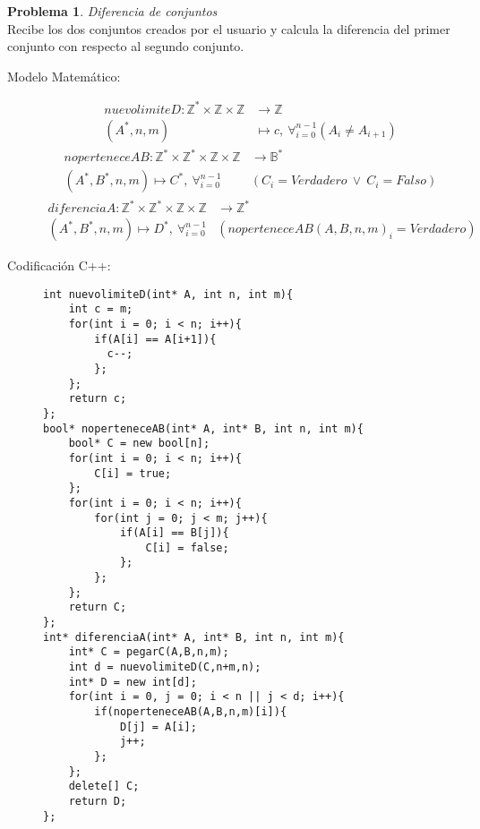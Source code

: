 \documentclass{article}
\theoremstyle{plain}
\theoremstyle{definition}
\newtheorem{problem}{Problema}
\begin{document}
\begin{problem}\emph{Diferencia de conjuntos}\\
Recibe los dos conjuntos creados por el usuario y calcula la diferencia del primer conjunto con respecto al segundo conjunto.
\begin{description}
\item[Modelo Matemático:]
%
\begin{align*}
nuevolimiteD: \mathbb{Z}^*\times\mathbb{Z}\times\mathbb{Z}&\to \mathbb{Z}\\
(A^*,n,m) &\mapsto c,\ \forall_{i=0}^{n-1}(A_i \neq A_{i+1})
\end{align*}
%
\begin{align*}
noperteneceAB: \mathbb{Z}^*\times\mathbb{Z}^*\times\mathbb{Z}\times\mathbb{Z}&\to \mathbb{B}^*\\
(A^*,B^*,n,m)\mapsto C^*,\ \forall_{i=0}^{n-1}&(C_i = Verdadero\ \lor \ C_i = Falso)
\end{align*}
%
\begin{align*}
diferenciaA: \mathbb{Z}^*\times\mathbb{Z}^*\times\mathbb{Z}\times\mathbb{Z}&\to \mathbb{Z}^*\\
(A^*,B^*,n,m)\mapsto D^*,\ \forall_{i=0}^{n-1}&(noperteneceAB(A,B,n,m)_i=Verdadero)
\end{align*}
%
\item[Codificación \textsf{C++}:]\hfill
%
\begin{verbatim}
int nuevolimiteD(int* A, int n, int m){
    int c = m;
    for(int i = 0; i < n; i++){
        if(A[i] == A[i+1]){
          c--;
        };
    };
    return c;
};
bool* noperteneceAB(int* A, int* B, int n, int m){
    bool* C = new bool[n];
    for(int i = 0; i < n; i++){
        C[i] = true;
    };
    for(int i = 0; i < n; i++){
        for(int j = 0; j < m; j++){
            if(A[i] == B[j]){
                C[i] = false;
            };
        };
    };
    return C;
};
int* diferenciaA(int* A, int* B, int n, int m){
    int* C = pegarC(A,B,n,m);
    int d = nuevolimiteD(C,n+m,n);
    int* D = new int[d];
    for(int i = 0, j = 0; i < n || j < d; i++){
        if(noperteneceAB(A,B,n,m)[i]){
            D[j] = A[i];
            j++;
        };
    };
    delete[] C;
    return D;
};
\end{verbatim}
\end{description}
\end{problem}
\end{document}
